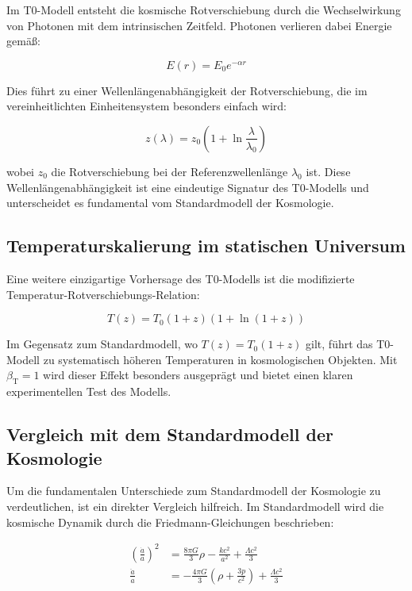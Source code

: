 \documentclass[12pt,a4paper]{article}
\newcommand{\betaT}{\beta_{\text{T}}}
\begin{document}
	Im T0-Modell entsteht die kosmische Rotverschiebung durch die Wechselwirkung von Photonen mit dem intrinsischen Zeitfeld. Photonen verlieren dabei Energie gemäß:
	
	\begin{equation}
		E(r) = E_0 e^{-\alpha r}
	\end{equation}
	
	Dies führt zu einer Wellenlängenabhängigkeit der Rotverschiebung, die im vereinheitlichten Einheitensystem besonders einfach wird:
	
	\begin{equation}
		z(\lambda) = z_0 \left(1 + \ln \frac{\lambda}{\lambda_0}\right)
	\end{equation}
	
	wobei \(z_0\) die Rotverschiebung bei der Referenzwellenlänge \(\lambda_0\) ist. Diese Wellenlängenabhängigkeit ist eine eindeutige Signatur des T0-Modells und unterscheidet es fundamental vom Standardmodell der Kosmologie.
	
	\subsection{Temperaturskalierung im statischen Universum}
	
	Eine weitere einzigartige Vorhersage des T0-Modells ist die modifizierte Temperatur-Rotverschiebungs-Relation:
	
	\begin{equation}
		T(z) = T_0 (1+z)(1 + \ln(1+z))
	\end{equation}
	
	Im Gegensatz zum Standardmodell, wo \(T(z) = T_0 (1+z)\) gilt, führt das T0-Modell zu systematisch höheren Temperaturen in kosmologischen Objekten. Mit \(\betaT = 1\) wird dieser Effekt besonders ausgeprägt und bietet einen klaren experimentellen Test des Modells.
	
	\subsection{Vergleich mit dem Standardmodell der Kosmologie}
	
	Um die fundamentalen Unterschiede zum Standardmodell der Kosmologie zu verdeutlichen, ist ein direkter Vergleich hilfreich. Im Standardmodell wird die kosmische Dynamik durch die Friedmann-Gleichungen beschrieben:
	
	\begin{align}
		\left(\frac{\dot{a}}{a}\right)^2 &= \frac{8\pi G}{3}\rho - \frac{kc^2}{a^2} + \frac{\Lambda c^2}{3} \\
		\frac{\ddot{a}}{a} &= -\frac{4\pi G}{3}\left(\rho + \frac{3p}{c^2}\right) + \frac{\Lambda c^2}{3}
	\end{align}
	
\end{document}
